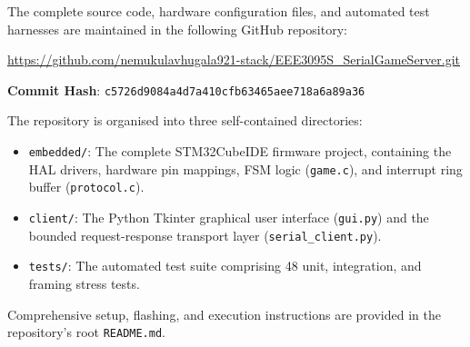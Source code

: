 
The complete source code, hardware configuration files, and automated test harnesses are maintained in the following GitHub repository:
\begin{center}
\url{https://github.com/nemukulavhugala921-stack/EEE3095S_SerialGameServer.git}
\end{center}

\textbf{Commit Hash}: \texttt{c5726d9084a4d7a410cfb63465aee718a6a89a36}

The repository is organised into three self-contained directories:
\begin{itemize}
    \item \texttt{embedded/}: The complete STM32CubeIDE firmware project, containing the HAL drivers, hardware pin mappings, FSM logic (\texttt{game.c}), and interrupt ring buffer (\texttt{protocol.c}).
    \item \texttt{client/}: The Python Tkinter graphical user interface (\texttt{gui.py}) and the bounded request-response transport layer (\texttt{serial\_client.py}).
    \item \texttt{tests/}: The automated test suite comprising 48 unit, integration, and framing stress tests.
\end{itemize}
Comprehensive setup, flashing, and execution instructions are provided in the repository's root \texttt{README.md}.
